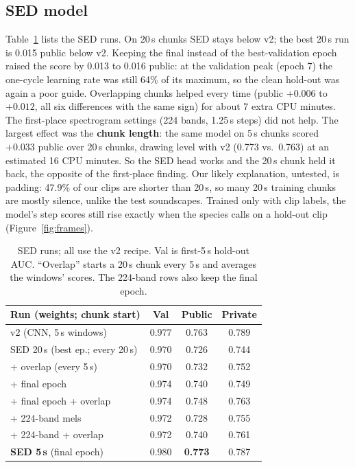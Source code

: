 \documentclass[letterpaper]{article} %
\begin{document}
\subsection{SED model}
Table~\ref{tab:sed} lists the SED runs. On 20\,s chunks SED stays below v2; the best 20\,s run is 0.015 public below v2. Keeping the final instead of the best-validation epoch raised the score by 0.013 to 0.016 public: at the validation peak (epoch 7) the one-cycle learning rate was still 64\% of its maximum, so the clean hold-out was again a poor guide. Overlapping chunks helped every time (public $+0.006$ to $+0.012$, all six differences with the same sign) for about 7 extra CPU minutes. The first-place spectrogram settings (224 bands, 1.25\,s steps) did not help. The largest effect was the \textbf{chunk length}: the same model on 5\,s chunks scored $+0.033$ public over 20\,s chunks, drawing level with v2 (0.773 vs.\ 0.763) at an estimated 16 CPU minutes. So the SED head works and the 20\,s chunk held it back, the opposite of the first-place finding. Our likely explanation, untested, is padding: 47.9\% of our clips are shorter than 20\,s, so many 20\,s training chunks are mostly silence, unlike the test soundscapes. Trained only with clip labels, the model's step scores still rise exactly when the species calls on a hold-out clip (Figure~\ref{fig:frames}).

\begin{table}[t]
\centering
\small
\begin{tabular}{lccc}
\toprule
Run (weights; chunk start) & Val & Public & Private \\
\midrule
v2 (CNN, 5\,s windows) & 0.977 & 0.763 & 0.789 \\
SED 20\,s (best ep.; every 20\,s) & 0.970 & 0.726 & 0.744 \\
\quad + overlap (every 5\,s) & 0.970 & 0.732 & 0.752 \\
\quad + final epoch & 0.974 & 0.740 & 0.749 \\
\quad + final epoch + overlap & 0.974 & 0.748 & 0.763 \\
\quad + 224-band mels & 0.972 & 0.728 & 0.755 \\
\quad + 224-band + overlap & 0.972 & 0.740 & 0.761 \\
\textbf{SED 5\,s} (final epoch) & 0.980 & \textbf{0.773} & 0.787 \\
\bottomrule
\end{tabular}
\caption{SED runs; all use the v2 recipe. Val is first-5\,s hold-out AUC. ``Overlap'' starts a 20\,s chunk every 5\,s and averages the windows' scores. The 224-band rows also keep the final epoch.}
\label{tab:sed}
\end{table}
\end{document}
